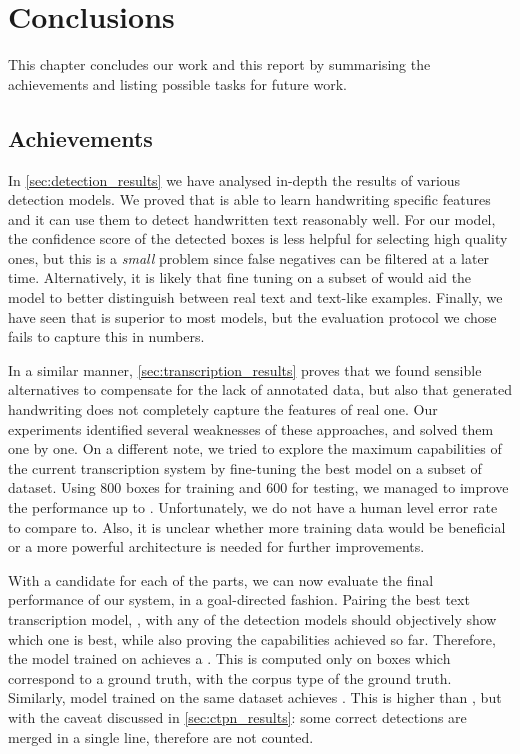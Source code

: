 
\chapter{Conclusions}\label{ch:conclusions}
This chapter concludes our work and this report by summarising the achievements and listing possible tasks for future work.

\section{Achievements}
In \autoref{sec:detection_results} we have analysed in-depth the results of various detection models. We proved that \FRCNN{} is able to learn handwriting specific features and it can use them to detect handwritten text reasonably well. For our model, the confidence score of the detected boxes is less helpful for selecting high quality ones, but this is a \emph{small} problem since false negatives can be filtered at a later time. Alternatively, it is likely that fine tuning on a subset of  would aid the model to better distinguish between real text and text-like examples. Finally, we have seen that \CTPN{} is superior to most \FRCNN{} models, but the evaluation protocol we chose fails to capture this in numbers.

In a similar manner, \autoref{sec:transcription_results} proves that we found sensible alternatives to compensate for the lack of annotated data, but also that generated handwriting does not completely capture the features of real one. Our experiments identified several weaknesses of these approaches, and solved them one by one. On a different note, we tried to explore the maximum capabilities of the current transcription system by fine-tuning the best model on a subset of  dataset. Using 800 boxes for training and 600 for testing, we managed to improve the performance up to . Unfortunately, we do not have a human level error rate to compare to. Also, it is unclear whether more training data would be beneficial or a more powerful architecture is needed for further improvements.

With a candidate for each of the parts, we can now evaluate the final performance of our system, in a goal-directed fashion. Pairing the best text transcription model, , with any of the detection models should objectively show which one is best, while also proving the capabilities achieved so far. Therefore, the \FRCNN{} model trained on  achieves a . This is computed only on boxes which correspond to a ground truth, with the corpus type of the ground truth. Similarly, \CTPN{} model trained on the same dataset achieves . This is higher than \FRCNN{}, but with the caveat discussed in \autoref{sec:ctpn_results}: some correct detections are merged in a single line, therefore are not counted.

